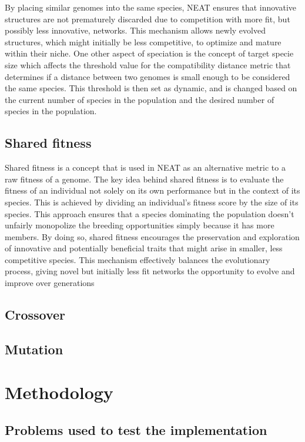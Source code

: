 \documentclass{article}
\begin{document}
By placing similar genomes into the same species, NEAT ensures that innovative structures are not prematurely discarded due to competition with more fit,
but possibly less innovative, networks.
This mechanism allows newly evolved structures, which might initially be less competitive, to optimize and mature within their niche.
One other aspect of speciation is the concept of target specie size which affects the threshold value for the compatibility distance metric that determines
if a distance between two genomes is small enough to be considered the same species. This threshold is then set as dynamic,
and is changed based on the current number of species in the population and the desired number of species in the population.



\subsection{Shared fitness}
Shared fitness is a concept that is used in NEAT as an alternative metric to a raw fitness of a genome.  
The key idea behind shared fitness is to evaluate the fitness of an individual not solely on its own performance but in the context of its species.
This is achieved by dividing an individual's fitness score by the size of its species.
This approach ensures that a species dominating the population doesn't unfairly monopolize the breeding opportunities simply because it has more members.
By doing so, shared fitness encourages the preservation and exploration of innovative and potentially beneficial traits that might arise in smaller,
less competitive species. This mechanism effectively balances the evolutionary process,
giving novel but initially less fit networks the opportunity to evolve and improve over generations


\subsection{Crossover}
\subsection{Mutation}
\section{Methodology}
    \subsection{Problems used to test the implementation}
\end{document}
